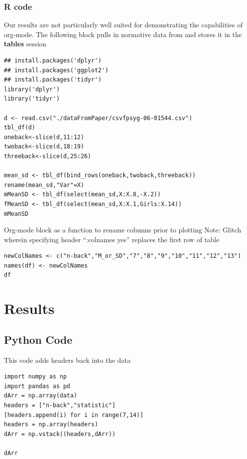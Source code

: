 \documentclass{article}
\begin{document}
\subsubsection{R code}
\label{sec:org2d533c3}
Our results are not particularly well suited for demonstrating the capabilities of org-mode. 
The following block pulls in normative data from \cite{NormativeData} and stores it in the \textbf{tables} session
\begin{verbatim}
## install.packages('dplyr')
## install.packages('ggplot2')
## install.packages('tidyr')
library('dplyr')
library('tidyr')

d <- read.csv("./dataFromPaper/csvfpsyg-06-01544.csv")
tbl_df(d)
oneback<-slice(d,11:12)
twoback<-slice(d,18:19)
threeback<-slice(d,25:26)

mean_sd <- tbl_df(bind_rows(oneback,twoback,threeback))
rename(mean_sd,"Var"=X)
mMeanSD <- tbl_df(select(mean_sd,X:X.8,-X.2))
fMeanSD <- tbl_df(select(mean_sd,X:X.1,Girls:X.14))
mMeanSD

\end{verbatim}

Org-mode block as a function to rename columns prior to plotting
Note: Glitch wherein specifying header ``:colnames yes'' replaces the first row of table
\begin{verbatim}
newColNames <- c("n-back","M_or_SD","7","8","9","10","11","12","13")
names(df) <- newColNames
df
\end{verbatim}




\section{Results}
\label{sec:org1c8646d}

\subsection{Python Code}
\label{sec:orgcca38cd}
This code adds headers back into the data
\begin{verbatim}
import numpy as np
import pandas as pd
dArr = np.array(data)
headers = ["n-back","statistic"]
[headers.append(i) for i in range(7,14)]
headers = np.array(headers)
dArr = np.vstack((headers,dArr))

dArr
\end{verbatim}
\end{document}
